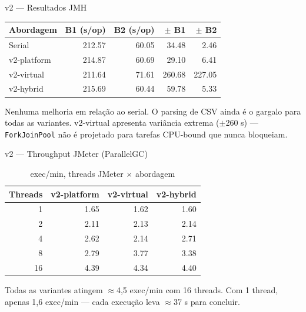 \begin{frame}{v2 --- Resultados JMH}
    \begin{table}
        \centering
        \small
        \begin{tabular}{lrrrr}
            \toprule
            \textbf{Abordagem} & \textbf{B1 (s/op)} & \textbf{B2 (s/op)} & \textbf{$\pm$ B1} & \textbf{$\pm$ B2} \\
            \midrule
            Serial      & 212.57 & 60.05 &  34.48 &   2.46 \\
            v2-platform & 214.87 & 60.69 &  29.10 &   6.41 \\
            v2-virtual  & 211.64 & 71.61 & 260.68 & 227.05 \\
            v2-hybrid   & 215.69 & 60.44 &  59.78 &   5.33 \\
            \bottomrule
        \end{tabular}
    \end{table}

    \medskip
    \alert{Nenhuma melhoria em relação ao serial.} O parsing de CSV ainda é o gargalo
    para todas as variantes. v2-virtual apresenta variância extrema ($\pm$260 s) ---
    \texttt{ForkJoinPool} não é projetado para tarefas CPU-bound que nunca bloqueiam.
\end{frame}

\begin{frame}{v2 --- Throughput JMeter (ParallelGC)}
    \begin{table}
        \centering
        \begin{tabular}{rrrr}
            \toprule
            \textbf{Threads} & \textbf{v2-platform} & \textbf{v2-virtual} & \textbf{v2-hybrid} \\
            \midrule
             1 & 1.65 & 1.62 & 1.60 \\
             2 & 2.11 & 2.13 & 2.14 \\
             4 & 2.62 & 2.14 & 2.71 \\
             8 & 2.79 & 3.77 & 3.38 \\
            16 & 4.39 & 4.34 & 4.40 \\
            \bottomrule
        \end{tabular}
        \caption*{exec/min, threads JMeter $\times$ abordagem}
    \end{table}

    \medskip
    Todas as variantes atingem $\approx$4,5 exec/min com 16 threads.
    Com 1 thread, apenas 1,6 exec/min --- cada execução leva $\approx$37 s para concluir.
\end{frame}

